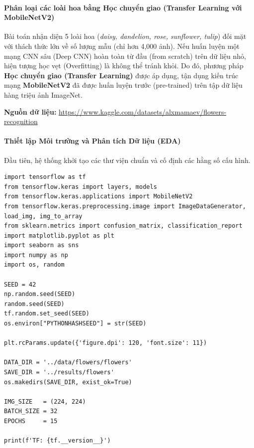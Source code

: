 \paragraph{Phân loại các loài hoa bằng Học chuyển giao (Transfer Learning với MobileNetV2)} \hfill\mbox{}

Bài toán nhận diện 5 loài hoa (\textit{daisy, dandelion, rose, sunflower, tulip}) đối mặt với thách thức lớn về số lượng mẫu (chỉ hơn 4,000 ảnh). Nếu huấn luyện một mạng CNN sâu (Deep CNN) hoàn toàn từ đầu (from scratch) trên dữ liệu nhỏ, hiện tượng học vẹt (Overfitting) là không thể tránh khỏi. Do đó, phương pháp \textbf{Học chuyển giao (Transfer Learning)} được áp dụng, tận dụng kiến trúc mạng \textbf{MobileNetV2} đã được huấn luyện trước (pre-trained) trên tập dữ liệu hàng triệu ảnh ImageNet. 

\begin{center}
    \textbf{Nguồn dữ liệu:} \url{https://www.kaggle.com/datasets/alxmamaev/flowers-recognition}
\end{center}

\paragraph{Thiết lập Môi trường và Phân tích Dữ liệu (EDA)} \hfill\mbox{}

Đầu tiên, hệ thống khởi tạo các thư viện chuẩn và cố định các hằng số cấu hình.

\begin{lstlisting}[style=pythoncode, caption={Khởi tạo môi trường thư viện học sâu}]
import tensorflow as tf
from tensorflow.keras import layers, models
from tensorflow.keras.applications import MobileNetV2
from tensorflow.keras.preprocessing.image import ImageDataGenerator, load_img, img_to_array
from sklearn.metrics import confusion_matrix, classification_report
import matplotlib.pyplot as plt
import seaborn as sns
import numpy as np
import os, random

SEED = 42
np.random.seed(SEED)
random.seed(SEED)
tf.random.set_seed(SEED)
os.environ["PYTHONHASHSEED"] = str(SEED)

plt.rcParams.update({'figure.dpi': 120, 'font.size': 11})

DATA_DIR = '../data/flowers/flowers'
SAVE_DIR = '../results/flowers'
os.makedirs(SAVE_DIR, exist_ok=True)

IMG_SIZE   = (224, 224)
BATCH_SIZE = 32
EPOCHS     = 15

print(f'TF: {tf.__version__}')
\end{lstlisting}

